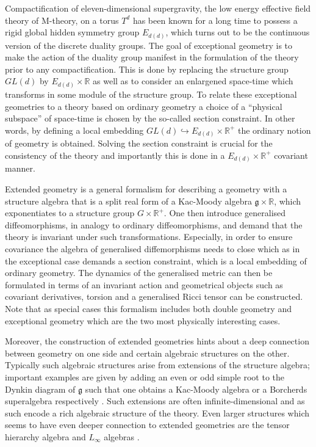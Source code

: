 Compactification of eleven-dimensional supergravity, the low energy effective field theory of M-theory, on a torus $T^d$ has been known for a long time to possess a rigid global hidden symmetry group $E_{d(d)}$\cite{CREMMER197848,Cremmer:1979up,Cremmer:1997ct}, which turns out to be the continuous version of the discrete duality groups. The goal of exceptional geometry is to make the action of the duality group manifest in the formulation of the theory prior to any compactification. This is done by replacing the structure group $GL(d)$ by $E_{d(d)}\times\mathbb{R}$ as well as to consider an enlargened space-time which transforms in some module of the structure group. To relate these exceptional geometries to a theory based on ordinary geometry a choice of a ``physical subspace'' of space-time is chosen by the so-called section constraint. In other words, by defining a local embedding $GL(d)\hookrightarrow E_{d(d)}\times\mathbb{R}^+$ the ordinary notion of geometry is obtained. Solving the section constraint is crucial for the consistency of the theory and importantly this is done in a $E_{d(d)}\times\mathbb{R}^+$ covariant manner. 

Extended geometry \cite{CederwallPalmkvist2017} is a general formalism for describing a geometry with a structure algebra that is a split real form of a Kac-Moody algebra $\mathfrak{g}\times\mathbb{R}$, which exponentiates to a structure group $G\times \mathbb{R}^+$. One then introduce generalised diffeomorphisms, in analogy to ordinary diffeomorphisms, and demand that the theory is invariant under such transformations. Especially, in order to ensure covariance the algebra of generalised diffemorphisms needs to close which as in the exceptional case demands a section constraint, which is a local embedding of ordinary geometry. The dynamics of the generalised metric can then be formulated in terms of an invariant action and geometrical objects such as covariant derivatives, torsion and a generalised Ricci tensor can be constructed. Note that as special cases this formalism includes both double geometry and exceptional geometry which are the two most physically interesting cases.


Moreover, the construction of extended geometries hints about a deep connection between geometry on one side and certain algebraic structures on the other. Typically such algebraic structures arise from extensions of the structure algebra; important examples are given by adding an even or odd simple root to the Dynkin diagram of $\mathfrak{g}$ such that one obtains a Kac-Moody algebra or a Borcherds superalgebra respectively \cite{Palmkvist2015ExpGeomSuperAlg,CederwallPalmkvistSuperalgebras2015}. Such extensions are often infinite-dimensional and as such encode a rich algebraic structure of the theory. Even larger structures which seems to have even deeper connection to extended geometries are the tensor hierarchy algebra \cite{Palmkvist:2013vya,Carbone:2018njd} and $L_\infty$ algebras \cite{Cederwall:2018aab,Hohm:2017pnh}.


